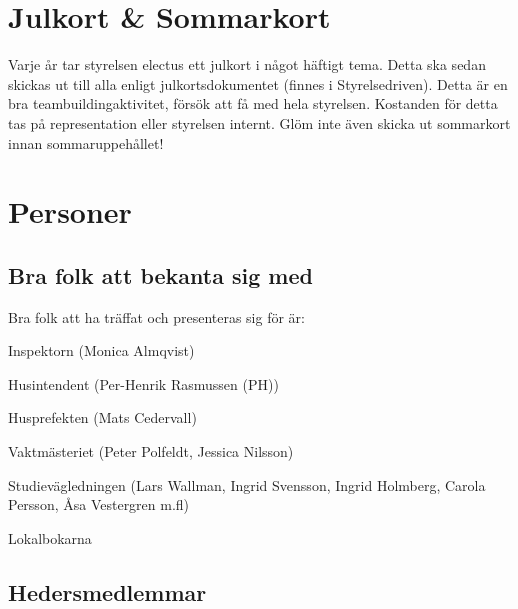\documentclass[10pt]{article}
\begin{document}
    \section{Julkort \& Sommarkort}
    
    Varje år tar styrelsen electus ett julkort i något häftigt tema. Detta ska sedan skickas ut till alla enligt julkortsdokumentet (finnes i Styrelsedriven). Detta är en bra teambuildingaktivitet, försök att få med hela styrelsen. Kostanden för detta tas på representation eller styrelsen internt. Glöm inte även skicka ut sommarkort innan sommaruppehållet!
    
    \section{Personer}
    
    \subsection{Bra folk att bekanta sig med}
    
    Bra folk att ha träffat och presenteras sig för är:
    \begin{dashlist}
    \item Inspektorn (Monica Almqvist)
    \item Husintendent (Per-Henrik Rasmussen (PH))
    \item Husprefekten (Mats Cedervall)
    \item Vaktmästeriet (Peter Polfeldt, Jessica Nilsson)
    \item Studievägledningen (Lars Wallman, Ingrid Svensson, Ingrid Holmberg, Carola Persson, Åsa Vestergren m.fl)
    \item Lokalbokarna
    \end{dashlist}
    
    \subsection{Hedersmedlemmar}
    
\end{document}
